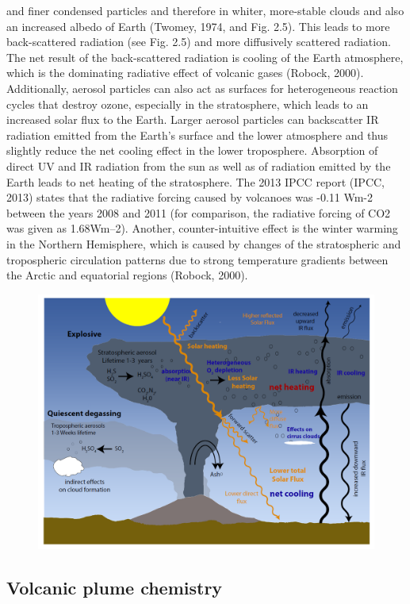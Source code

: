 \documentclass  [
  paper    = a4,
  BCOR     = 10mm,
  twoside,
  fontsize = 12pt,
  fleqn,
  toc      = bibnumbered,
  toc      = listofnumbered,
  numbers  = noendperiod,
  headings = normal,
  listof   = leveldown,
  version  = 3.03
]                                       {scrreprt}
\begin{document}
	and finer condensed particles and therefore in whiter, more-stable clouds and
	also an increased albedo of Earth (Twomey, 1974, and Fig. 2.5). This leads
	to more back-scattered radiation (see Fig. 2.5) and more diffusively scattered radiation. The net result of the back-scattered radiation is cooling of the Earth
	atmosphere, which is the dominating radiative effect of volcanic gases (Robock,
	2000). Additionally, aerosol particles can also act as surfaces for heterogeneous
	reaction cycles that destroy ozone, especially in the stratosphere, which leads to
	an increased solar flux to the Earth. Larger aerosol particles can backscatter IR
	radiation emitted from the Earth’s surface and the lower atmosphere and thus
	slightly reduce the net cooling effect in the lower troposphere. Absorption of
	direct UV and IR radiation from the sun as well as of radiation emitted by the
	Earth leads to net heating of the stratosphere. The 2013 IPCC report (IPCC,
	2013) states that the radiative forcing caused by volcanoes was -0.11 Wm-2
	between the years 2008 and 2011 (for comparison, the radiative forcing of CO2
	was given as 1.68Wm–2). Another, counter-intuitive effect is the winter warming
	in the Northern Hemisphere, which is caused by changes of the stratospheric and
	tropospheric circulation patterns due to strong temperature gradients between
	the Arctic and equatorial regions (Robock, 2000).
	\begin{figure}
		\centering
		\includegraphics[width=0.7\linewidth]{Bilder/Simon/Bilder_Tung/Climate_Influence}
		\caption{}
		\label{fig:climateinfluence}
	\end{figure}
	
	\subsection{Volcanic plume chemistry}
\end{document}
